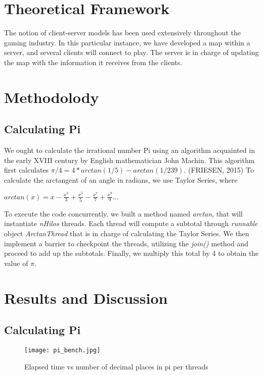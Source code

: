 \documentclass[10pt,a4paper]{article}
\theoremstyle{definition}
\begin{document}
\section{Theoretical Framework}
The notion of client-server models has been used extensively throughout the gaming industry. In this particular instance, we have developed a map within a server, and several clients will connect to play. The server is in charge of updating the map with the information it receives from the clients.

\section{Methodolody}
\subsection{Calculating Pi}
We ought to calculate the irrational number Pi using an algorithm acquainted in the early XVIII century by English mathematician John Machin. This algorithm first calculates \(\pi/4 = 4 * arctan(1/5) - arctan(1/239)\). (FRIESEN, 2015)\cite{FRIESEN2015} To calculate the arctangent of an angle in radians, we use Taylor Series, where\\
\begin{center}\(arctan(x) = x - \frac{x^3}{3} + \frac{x^5}{5} - \frac{x^7}{7} + \frac{x^9}{9} ...\)\end{center}
To execute the code concurrently, we built a method named \emph{arctan}, that will instantiate \emph{nHilos} threads. Each thread will compute a subtotal through \emph{runnable} object \emph{ArctanThread} that is in charge of calculating the Taylor Series. We then implement a barrier to checkpoint the threads, utilizing the \emph{join()} method and proceed to add up the subtotals. Finally, we multiply this total by 4 to obtain the value of \(\pi\).

\section{Results and Discussion}
\subsection{Calculating Pi}
\begin{figure}[H]
    \centering
    \texttt{[image: pi\_bench.jpg]}
    \caption{Elapsed time vs number of decimal places in pi per threads}
    \label{fig:pi}
\end{figure}
\end{document}
